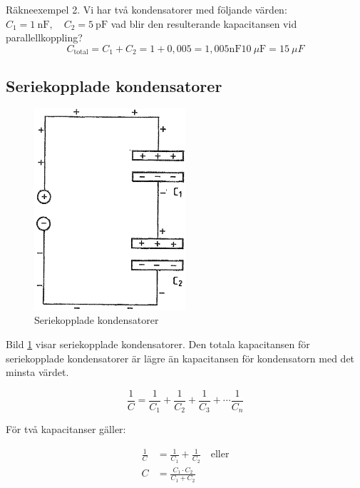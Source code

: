 \noindent Räkneexempel 2.
Vi har två kondensatorer med följande värden: \(C_1 =
\SI{1}{\nano\farad},\quad C_2 = \SI{5}{\pico\farad} \) vad blir den
  resulterande kapacitansen vid parallellkoppling?
\[   C_{\text{total}} = C_1 + C_2 = 1 + 0,005 = 1,005\unit{\nano\farad}
     \SI{10}{\mu\farad} = \SI{15}{\mu F} \]
 

\subsection{Seriekopplade kondensatorer}

\begin{figure}[ht]
\begin{center}
  \includegraphics[width=0.5\textwidth]{images/cropped_pdfs/bild_2_3-06.pdf}
  \caption{Seriekopplade kondensatorer}
  \label{fig:BildII3-06}
\end{center}
\end{figure}

Bild \ref{fig:BildII3-06} visar seriekopplade kondensatorer.
Den totala kapacitansen för seriekopplade kondensatorer är lägre än kapacitansen
för kondensatorn med det minsta värdet.

\[
\frac{1}{C} = \frac{1}{C_1} + \frac{1}{C_2} +
\frac{1}{C_3} + \cdots \frac{1}{C_n}
\]

För två kapacitanser gäller:

\begin{align*}
  \frac{1}{C} &= \frac{1}{C_1} + \frac{1}{C_2} \quad \text{eller} \\
  C &= \frac{C_1 \cdot C_2}{C_1 + C_2}
\end{align*}


